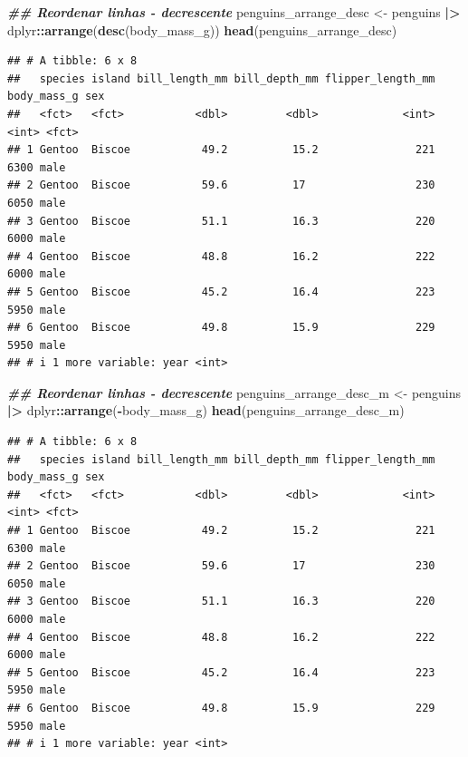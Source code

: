 \documentclass[
]{article}
\newenvironment{Shaded}{\begin{snugshade}}{\end{snugshade}}
\newcommand{\DocumentationTok}[1]{\textcolor[rgb]{0.56,0.35,0.01}{\textbf{\textit{#1}}}}
\newcommand{\FunctionTok}[1]{\textcolor[rgb]{0.13,0.29,0.53}{\textbf{#1}}}
\newcommand{\NormalTok}[1]{#1}
\newcommand{\OtherTok}[1]{\textcolor[rgb]{0.56,0.35,0.01}{#1}}
\newcommand{\SpecialCharTok}[1]{\textcolor[rgb]{0.81,0.36,0.00}{\textbf{#1}}}
\begin{document}
\begin{Shaded}
\begin{Highlighting}[]
\DocumentationTok{\#\# Reordenar linhas {-} decrescente}
\NormalTok{penguins\_arrange\_desc }\OtherTok{\textless{}{-}}\NormalTok{ penguins }\SpecialCharTok{|\textgreater{}} 
\NormalTok{    dplyr}\SpecialCharTok{::}\FunctionTok{arrange}\NormalTok{(}\FunctionTok{desc}\NormalTok{(body\_mass\_g))}
\FunctionTok{head}\NormalTok{(penguins\_arrange\_desc)}
\end{Highlighting}
\end{Shaded}

\begin{verbatim}
## # A tibble: 6 x 8
##   species island bill_length_mm bill_depth_mm flipper_length_mm body_mass_g sex  
##   <fct>   <fct>           <dbl>         <dbl>             <int>       <int> <fct>
## 1 Gentoo  Biscoe           49.2          15.2               221        6300 male 
## 2 Gentoo  Biscoe           59.6          17                 230        6050 male 
## 3 Gentoo  Biscoe           51.1          16.3               220        6000 male 
## 4 Gentoo  Biscoe           48.8          16.2               222        6000 male 
## 5 Gentoo  Biscoe           45.2          16.4               223        5950 male 
## 6 Gentoo  Biscoe           49.8          15.9               229        5950 male 
## # i 1 more variable: year <int>
\end{verbatim}

\begin{Shaded}
\begin{Highlighting}[]
\DocumentationTok{\#\# Reordenar linhas {-} decrescente}
\NormalTok{penguins\_arrange\_desc\_m }\OtherTok{\textless{}{-}}\NormalTok{ penguins }\SpecialCharTok{|\textgreater{}} 
\NormalTok{    dplyr}\SpecialCharTok{::}\FunctionTok{arrange}\NormalTok{(}\SpecialCharTok{{-}}\NormalTok{body\_mass\_g)}
\FunctionTok{head}\NormalTok{(penguins\_arrange\_desc\_m)}
\end{Highlighting}
\end{Shaded}

\begin{verbatim}
## # A tibble: 6 x 8
##   species island bill_length_mm bill_depth_mm flipper_length_mm body_mass_g sex  
##   <fct>   <fct>           <dbl>         <dbl>             <int>       <int> <fct>
## 1 Gentoo  Biscoe           49.2          15.2               221        6300 male 
## 2 Gentoo  Biscoe           59.6          17                 230        6050 male 
## 3 Gentoo  Biscoe           51.1          16.3               220        6000 male 
## 4 Gentoo  Biscoe           48.8          16.2               222        6000 male 
## 5 Gentoo  Biscoe           45.2          16.4               223        5950 male 
## 6 Gentoo  Biscoe           49.8          15.9               229        5950 male 
## # i 1 more variable: year <int>
\end{verbatim}
\end{document}
